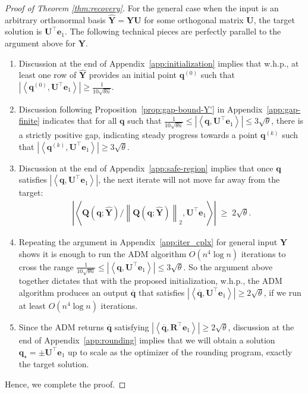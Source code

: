 \documentclass[11pt, journal, final]{IEEEtran}
\numberwithin{equation}{section}
\newcommand{\mb}{\mathbf}
\newcommand{\norm}[1]{\left\lVert#1\right\rVert}
\newcommand{\ol}{\overline}
\newcommand{ \abs }[1]{\left| #1 \right|}
\newcommand{ \paren }[1]{ \left( #1 \right) }
\newcommand{\innerprod}[2]{\left\langle #1,  #2 \right\rangle}
\begin{document}
{\begin{proof}[Proof of Theorem \ref{thm:recovery}]
For the general case when the input is an arbitrary orthonormal basis $\widehat{\mb Y} = \mb Y \mb U$ for some orthogonal matrix $\mb U$, the target solution is $\mb U^\top \mb e_1$. The following technical pieces are perfectly parallel to the argument above for $\mb Y$.
\begin{enumerate}
\item Discussion at the end of Appendix~\ref{app:initialization} implies that w.h.p., at least one row of $\widehat{\mb Y}$ provides an initial point $\mb q^{(0)}$ such that $\abs{\innerprod{\mb q^{(0)}}{\mb U^\top \mb e_1}} \ge \frac{1}{10\sqrt{\theta n}}$.
\item Discussion following Proposition~\ref{prop:gap-bound-Y'} in Appendix~\ref{app:gap-finite} indicates that for all $\mb q$ such that $\frac{1}{10\sqrt{\theta n}} \le \abs{\innerprod{\mb q}{\mb U^\top \mb e_1}} \le 3\sqrt{\theta}$, there is a strictly positive gap, indicating steady progress towards a point $\mb q^{(k)}$ such that $\abs{\innerprod{\mb q^{(k)}}{\mb U^\top \mb e_1}} \ge 3\sqrt{\theta}$.
\item Discussion at the end of Appendix~\ref{app:safe-region} implies that once $\mb q$ satisfies $\abs{\innerprod{\mb q}{\mb U^\top \mb e_1}}$, the next iterate will not move far away from the target:
\begin{align*}
\abs{\innerprod{\mb Q\paren{\mb q; \widehat{\mb Y}}/\norm{\mb Q\paren{\mb q; \widehat{\mb Y}}}_2 }{\mb U^\top \mb e_1}} \;\geq\; 2\sqrt{\theta}.
\end{align*}
\item Repeating the argument in Appendix~\ref{app:iter_cplx} for general input $\widehat{\mb Y}$ shows it is enough to run the ADM algorithm $O\paren{n^4 \log n}$ iterations to cross the range $\frac{1}{10\sqrt{\theta n}} \le \abs{\innerprod{\mb q}{\mb U^\top \mb e_1}} \le 3\sqrt{\theta}$. So the argument above together dictates that with the proposed initialization, w.h.p., the ADM algorithm produces an output $\ol{\mb q}$ that satisfies $\abs{\innerprod{\ol{\mb q}}{\mb U^\top \mb e_1}} \ge 2\sqrt{\theta}$, if we run at least $O\paren{n^4 \log n}$ iterations.
\item Since the ADM returns $\ol{\mb q}$ satisfying $\abs{\innerprod{\overline{\mb q}}{\mb R^\top \mb e_1}} \ge 2\sqrt{\theta}$, discussion at the end of Appendix~\ref{app:rounding} implies that we will obtain a solution $\mb q_\star = \pm \mb U^\top \mb e_1$ up to scale as the optimizer of the rounding program, exactly the target solution.
\end{enumerate}
Hence, we complete the proof.
\end{proof}

}
\end{document}
